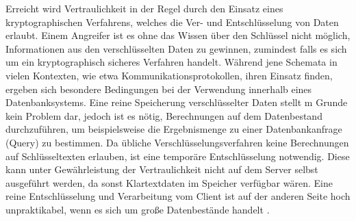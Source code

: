 Erreicht wird Vertraulichkeit in der Regel durch den Einsatz eines kryptographischen Verfahrens, welches die Ver- und Entschlüsselung von Daten erlaubt. Einem Angreifer ist es ohne das Wissen über den Schlüssel nicht möglich, Informationen aus den verschlüsselten Daten zu gewinnen, zumindest falls es sich um ein kryptographisch sicheres Verfahren handelt. Während jene Schemata in vielen Kontexten, wie etwa Kommunikationsprotokollen, ihren Einsatz finden, ergeben sich besondere Bedingungen bei der Verwendung innerhalb eines Datenbanksystems. Eine reine Speicherung verschlüsselter Daten stellt m Grunde kein Problem dar, jedoch ist es nötig, Berechnungen auf dem Datenbestand durchzuführen, um beispielsweise die Ergebnismenge zu einer Datenbankanfrage (Query) zu bestimmen. Da übliche Verschlüsselungsverfahren keine Berechnungen auf Schlüsseltexten erlauben, ist eine temporäre Entschlüsselung notwendig. Diese kann unter Gewährleistung der Vertraulichkeit nicht auf dem Server selbst ausgeführt werden, da sonst Klartextdaten im Speicher verfügbar wären. Eine reine Entschlüsselung und Verarbeitung vom Client ist auf der anderen Seite hoch unpraktikabel, wenn es sich um große Datenbestände handelt \cite{Popa2012}.
%
%
%
%
%

